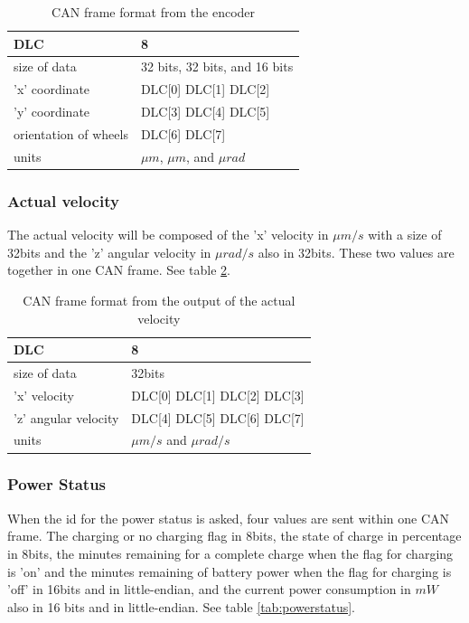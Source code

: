 \documentclass[12pt]{report}%
\begin{document}
\begin{table}[h!]
\centering
\begin{tabular}{|l|l|}
	\hline
	DLC										&	8																\\	\hline
	size of data					&	32 bits, 32 bits, and 16 bits		\\	\hline
	'x' coordinate				&	DLC[0] DLC[1] DLC[2] 						\\	\hline
	'y'	coordinate				&	DLC[3] DLC[4] DLC[5] 						\\	\hline
	orientation of wheels	&	DLC[6] DLC[7] 									\\	\hline
	units									&	$\mu m$, $\mu m$, and $\mu rad$	\\	\hline
\end{tabular}
\caption{\label{tab:encoder} CAN frame format from the encoder}
\end{table}

\subsubsection{Actual velocity}
The actual velocity will be composed of the 'x' velocity in $\mu m/s$ with a size of 32bits and the 'z' angular velocity in $\mu rad/s$ also in 32bits. These two values are together in one CAN frame. See table \ref{tab:velocity}.

\begin{table}[h!]
\centering
\begin{tabular}{|l|l|}
	\hline
	DLC										&	8														\\	\hline
	size of data					&	32bits											\\	\hline
	'x' velocity					&	DLC[0] DLC[1] DLC[2] DLC[3]	\\	\hline
	'z'	angular velocity	&	DLC[4] DLC[5] DLC[6] DLC[7]	\\	\hline
	units									&	$\mu m/s$ and $\mu rad/s$		\\	\hline
\end{tabular}
\caption{\label{tab:velocity} CAN frame format from the output of the actual velocity}
\end{table}

\subsubsection{Power Status}
When the id for the power status is asked, four values are sent within one CAN frame. The charging or no charging flag in 8bits, the state of charge in percentage in 8bits, the minutes remaining for a complete charge when the flag for charging is 'on' and the minutes remaining of battery power when the flag for charging is 'off' in 16bits and in little-endian, and the current power consumption in $mW$ also in 16 bits and in little-endian. See table \ref{tab:powerstatus}.
\end{document}
